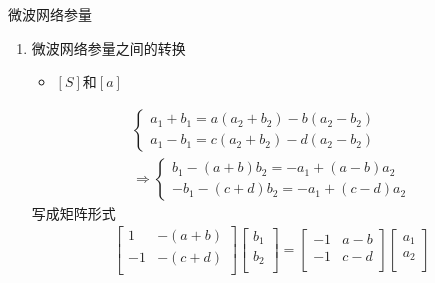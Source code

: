 \begin{frame}{微波网络参量}
    \begin{enumerate}
        \resume
        \item 微波网络参量之间的转换
              \begin{itemize}
                  \item $[S]$和$[a]$
              \end{itemize}
              \begin{align*}
                  \begin{cases}
                      a_1+b_1=a(a_2+b_2)-b(a_2-b_2) \\
                      a_1-b_1=c(a_2+b_2)-d(a_2-b_2)
                  \end{cases} \\
                  \Rightarrow
                  \begin{cases}
                      b_1-(a+b)b_2=-a_1+(a-b)a_2 \\
                      -b_1-(c+d)b_2=-a_1+(c-d)a_2
                  \end{cases}
              \end{align*}
              写成矩阵形式
              \begin{align*}
                  \begin{bmatrix*}
                      1 & -(a+b) \\
                      -1 & -(c+d) \\
                  \end{bmatrix*}
                  \begin{bmatrix*}
                      b_1 \\
                      b_2 \\
                  \end{bmatrix*}
                  =
                  \begin{bmatrix*}
                      -1 & a-b \\
                      -1 & c-d \\
                  \end{bmatrix*}
                  \begin{bmatrix*}
                      a_1 \\
                      a_2 \\
                  \end{bmatrix*}
              \end{align*}
    \end{enumerate}
\end{frame}

